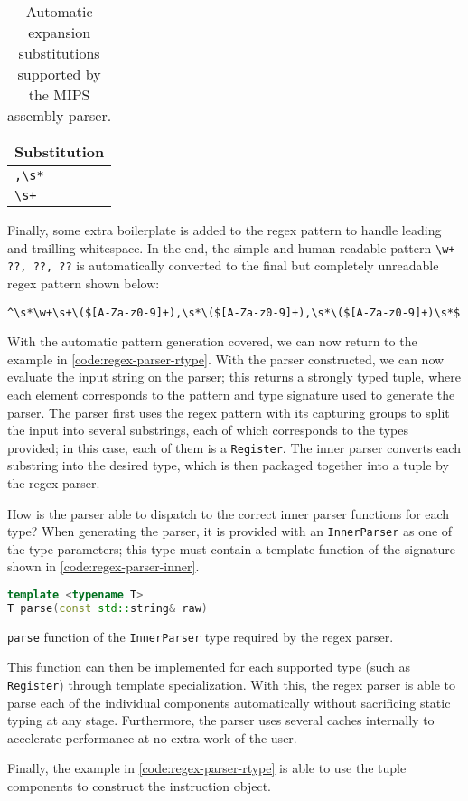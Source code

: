 \begin{table}[H] 
    \centering
    \begin{tabular}{l}
        \toprule
        Substitution \\
        \midrule
        \texttt{,\textbackslash s*} \\
        \texttt{\textbackslash s+} \\
        \bottomrule
    \end{tabular}
    \caption{Automatic expansion substitutions supported by the MIPS assembly parser.}
    \label{tbl:parser-exp-subs}
\end{table}

Finally, some extra boilerplate is added to the regex pattern to handle leading and trailling whitespace. In the end, the simple and human-readable pattern \texttt{\textbackslash w+ ??, ??, ??} is automatically converted to the final but completely unreadable regex pattern shown below:

\texttt{\^{}\textbackslash s*\textbackslash w+\textbackslash s+\textbackslash (\$[A-Za-z0-9]+),\textbackslash s*\textbackslash (\$[A-Za-z0-9]+),\textbackslash s*\textbackslash (\$[A-Za-z0-9]+)\textbackslash s*\$}

With the automatic pattern generation covered, we can now return to the example in \autoref{code:regex-parser-rtype}. With the parser constructed, we can now evaluate the input string on the parser; this returns a strongly typed tuple, where each element corresponds to the pattern and type signature used to generate the parser. The parser first uses the regex pattern with its capturing groups to split the input into several substrings, each of which corresponds to the types provided; in this case, each of them is a \texttt{Register}. The inner parser converts each substring into the desired type, which is then packaged together into a tuple by the regex parser.

How is the parser able to dispatch to the correct inner parser functions for each type? When generating the parser, it is provided with an \texttt{InnerParser} as one of the type parameters; this type must contain a template function of the signature shown in \autoref{code:regex-parser-inner}.

\begin{lstfloat}[H]
    \begin{lstlisting}[language=c++]
template <typename T>
T parse(const std::string& raw)
    \end{lstlisting}
    \caption{\texttt{parse} function of the \texttt{InnerParser} type required by the regex parser.}
    \label{code:regex-parser-inner}
\end{lstfloat}

This function can then be implemented for each supported type (such as \texttt{Register}) through template specialization. With this, the regex parser is able to parse each of the individual components automatically without sacrificing static typing at any stage. Furthermore, the parser uses several caches internally to accelerate performance at no extra work of the user.

Finally, the example in \autoref{code:regex-parser-rtype} is able to use the tuple components to construct the instruction object.